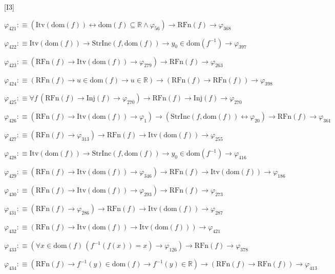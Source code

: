 \begin{fullproof}{[I3]}
\begin{abbrevlist}
\item $\varphi_{421} :\equiv (\mathrm{Itv}(\mathrm{dom}(f)) \leftrightarrow \mathrm{dom}(f) \subseteq \mathbb{R} \land \varphi_{56}) \to \mathrm{RFn}(f) \to \varphi_{368}$
\item $\varphi_{422} :\equiv \mathrm{Itv}(\mathrm{dom}(f)) \to \mathrm{StrInc}(f,\mathrm{dom}(f)) \to y_{0} \in \mathrm{dom}(f^{-1}) \to \varphi_{397}$
\item $\varphi_{423} :\equiv (\mathrm{RFn}(f) \to \mathrm{Itv}(\mathrm{dom}(f)) \to \varphi_{279}) \to \mathrm{RFn}(f) \to \varphi_{263}$
\item $\varphi_{424} :\equiv (\mathrm{RFn}(f) \to u \in \mathrm{dom}(f) \to u \in \mathbb{R}) \to (\mathrm{RFn}(f) \to \mathrm{RFn}(f)) \to \varphi_{398}$
\item $\varphi_{425} :\equiv \forall f\,(\mathrm{RFn}(f) \to \mathrm{Inj}(f) \to \varphi_{270}) \to \mathrm{RFn}(f) \to \mathrm{Inj}(f) \to \varphi_{270}$
\item $\varphi_{426} :\equiv (\mathrm{RFn}(f) \to \mathrm{Itv}(\mathrm{dom}(f)) \to \varphi_{1}) \to (\mathrm{StrInc}(f,\mathrm{dom}(f)) \leftrightarrow \varphi_{20}) \to \mathrm{RFn}(f) \to \varphi_{361}$
\item $\varphi_{427} :\equiv (\mathrm{RFn}(f) \to \varphi_{313}) \to \mathrm{RFn}(f) \to \mathrm{Itv}(\mathrm{dom}(f)) \to \varphi_{255}$
\item $\varphi_{428} :\equiv \mathrm{Itv}(\mathrm{dom}(f)) \to \mathrm{StrInc}(f,\mathrm{dom}(f)) \to y_{0} \in \mathrm{dom}(f^{-1}) \to \varphi_{416}$
\item $\varphi_{429} :\equiv (\mathrm{RFn}(f) \to \mathrm{Itv}(\mathrm{dom}(f)) \to \varphi_{346}) \to \mathrm{RFn}(f) \to \mathrm{Itv}(\mathrm{dom}(f)) \to \varphi_{186}$
\item $\varphi_{430} :\equiv (\mathrm{RFn}(f) \to \mathrm{Itv}(\mathrm{dom}(f)) \to \varphi_{293}) \to \mathrm{RFn}(f) \to \varphi_{273}$
\item $\varphi_{431} :\equiv (\mathrm{RFn}(f) \to \varphi_{286}) \to \mathrm{RFn}(f) \to \mathrm{Itv}(\mathrm{dom}(f)) \to \varphi_{287}$
\item $\varphi_{432} :\equiv (\mathrm{RFn}(f) \to \mathrm{Itv}(\mathrm{dom}(f)) \to \mathrm{Itv}(\mathrm{dom}(f))) \to \varphi_{421}$
\item $\varphi_{433} :\equiv (\forall x \in \mathrm{dom}(f)\,(f^{-1}(f(x)) = x) \to \varphi_{126}) \to \mathrm{RFn}(f) \to \varphi_{378}$
\item $\varphi_{434} :\equiv (\mathrm{RFn}(f) \to f^{-1}(y) \in \mathrm{dom}(f) \to f^{-1}(y) \in \mathbb{R}) \to (\mathrm{RFn}(f) \to \mathrm{RFn}(f)) \to \varphi_{413}$

\end{abbrevlist}
\end{fullproof}
